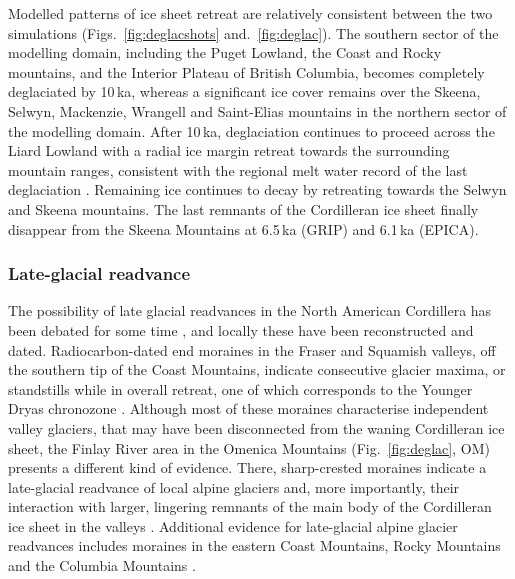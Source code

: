\documentclass[tc]{copernicus}
\begin{document}
Modelled patterns of ice sheet retreat are relatively consistent between the
two simulations (Figs.~\ref{fig:deglacshots} and.~\ref{fig:deglac}). The
southern sector of the modelling domain, including the Puget Lowland, the Coast
and Rocky mountains, and the Interior Plateau of British Columbia, becomes
completely deglaciated by 10\,ka, whereas a significant ice cover remains over
the Skeena, Selwyn, Mackenzie, Wrangell and Saint-Elias mountains in the
northern sector of the modelling domain. After 10\,ka, deglaciation continues
to proceed across the Liard Lowland with a radial ice margin retreat towards
the surrounding mountain ranges, consistent with the regional melt water record
of the last deglaciation \citep{Margold.etal.2013}. Remaining ice continues to
decay by retreating towards the Selwyn and Skeena mountains. The last remnants
of the Cordilleran ice sheet finally disappear from the Skeena Mountains at
6.5\,ka (GRIP) and 6.1\,ka (EPICA).

\subsubsection{Late-glacial readvance}

The possibility of late glacial readvances in the North American Cordillera has
been debated for some time \citep{Osborn.Gerloff.1997}, and locally these have
been reconstructed and dated. Radiocarbon-dated end moraines in the Fraser and
Squamish valleys, off the southern tip of the Coast Mountains, indicate
consecutive glacier maxima, or standstills while in overall retreat, one of
which corresponds to the Younger Dryas chronozone \citep{Clague.etal.1997,
Friele.Clague.2002, Friele.Clague.2002a, Kovanen.2002,
Kovanen.Easterbrook.2002}. Although most of these moraines characterise
independent valley glaciers, that may have been disconnected from the waning
Cordilleran ice sheet, the Finlay River area in the Omenica Mountains
(Fig.~\ref{fig:deglac}, OM) presents a different kind of evidence.
There, sharp-crested moraines indicate a late-glacial readvance of local alpine
glaciers and, more importantly, their interaction with larger, lingering
remnants of the main body of the Cordilleran ice sheet in the valleys
\citep{Lakeman.etal.2008}. Additional evidence for late-glacial
alpine glacier readvances includes moraines in the eastern Coast Mountains,
Rocky Mountains and the Columbia Mountains \citep{Osborn.Gerloff.1997,
Menounos.etal.2008}.
\end{document}
